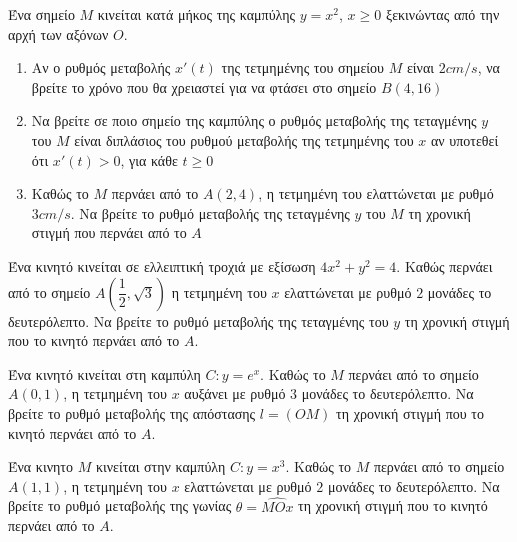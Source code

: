 \documentclass{presentation}
\begin{document}
\begin{askisi}
    Ένα σημείο $Μ$ κινείται κατά μήκος της καμπύλης $y=x^2$, $x\ge0$ ξεκινώντας από την αρχή των αξόνων $Ο$.
    \begin{enumerate}
        \item<1-> Αν ο ρυθμός μεταβολής $x'(t)$ της τετμημένης του σημείου $Μ$ είναι $2cm/s$, να βρείτε το χρόνο που θα χρειαστεί για να φτάσει στο σημείο $Β(4,16)$
        \item<2-> Να βρείτε σε ποιο σημείο της καμπύλης ο ρυθμός μεταβολής της τεταγμένης $y$ του $Μ$ είναι διπλάσιος του ρυθμού μεταβολής της τετμημένης του $x$ αν υποτεθεί ότι $x'(t)>0$, για κάθε $t\ge0$
        \item<3-> Καθώς το $Μ$ περνάει από το $Α(2,4)$, η τετμημένη του ελαττώνεται με ρυθμό $3cm/s$. Να βρείτε το ρυθμό μεταβολής της τεταγμένης $y$ του $Μ$ τη χρονική στιγμή που περνάει από το $Α$
    \end{enumerate}

\end{askisi}

\begin{askisi}
    Ένα κινητό κινείται σε ελλειπτική τροχιά με εξίσωση $4x^2+y^2=4$. Καθώς περνάει από το σημείο $Α(\dfrac{1}{2},\sqrt{3})$ η τετμημένη του $x$ ελαττώνεται με ρυθμό $2$ μονάδες το δευτερόλεπτο. Να βρείτε το ρυθμό μεταβολής της τεταγμένης του $y$ τη χρονική στιγμή που το κινητό περνάει από το $Α$.

\end{askisi}

\begin{askisi}
    Ένα κινητό κινείται στη καμπύλη $C:y=e^x$. Καθώς το $Μ$ περνάει από το σημείο $Α(0,1)$, η τετμημένη του $x$ αυξάνει με ρυθμό $3$ μονάδες το δευτερόλεπτο. Να βρείτε το ρυθμό μεταβολής της απόστασης $l=(ΟΜ)$ τη χρονική στιγμή που το κινητό περνάει από το $Α$.

\end{askisi}

\begin{askisi}
    Ένα κινητο $Μ$ κινείται στην καμπύλη $C:y=x^3$. Καθώς το $Μ$ περνάει από το σημείο $Α(1,1)$, η τετμημένη του $x$ ελαττώνεται με ρυθμό $2$ μονάδες το δευτερόλεπτο. Να βρείτε το ρυθμό μεταβολής της γωνίας $θ=\hat{ΜΟx}$ τη χρονική στιγμή που το κινητό περνάει από το $Α$.

\end{askisi}
\end{document}
